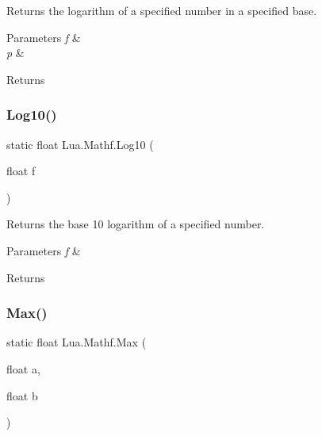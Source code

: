 Returns the logarithm of a specified number in a specified base. 


\begin{DoxyParams}{Parameters}
{\em f} & \\
\hline
{\em p} & \\
\hline
\end{DoxyParams}
\begin{DoxyReturn}{Returns}

\end{DoxyReturn}
\mbox{\label{class_lua_1_1_mathf_afcdb61fd1acfbe37c5e7a675421f3dc9}} 
\subsubsection{\texorpdfstring{Log10()}{Log10()}}
{\footnotesize\ttfamily static float Lua.\+Mathf.\+Log10 (\begin{DoxyParamCaption}\item[{float}]{f }\end{DoxyParamCaption})\hspace{0.3cm}{\ttfamily [static]}}



Returns the base 10 logarithm of a specified number. 


\begin{DoxyParams}{Parameters}
{\em f} & \\
\hline
\end{DoxyParams}
\begin{DoxyReturn}{Returns}

\end{DoxyReturn}
\mbox{\label{class_lua_1_1_mathf_ae0c3619a26a60fdc6442011911e0e412}} 
\subsubsection{\texorpdfstring{Max()}{Max()}\hspace{0.1cm}{\footnotesize\ttfamily [1/2]}}
{\footnotesize\ttfamily static float Lua.\+Mathf.\+Max (\begin{DoxyParamCaption}\item[{float}]{a,  }\item[{float}]{b }\end{DoxyParamCaption})\hspace{0.3cm}{\ttfamily [static]}}



